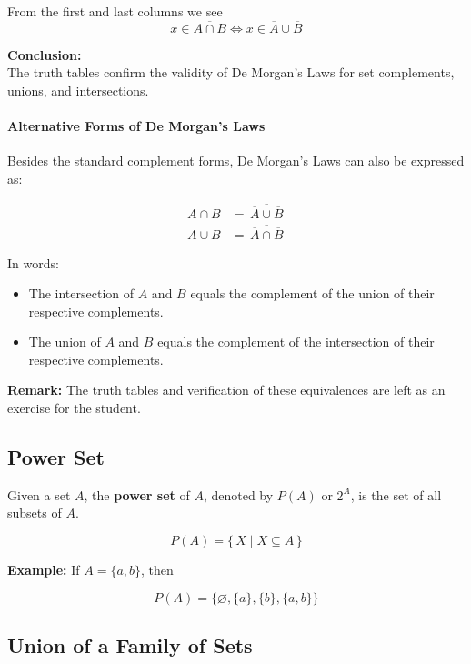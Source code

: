 \documentclass[11pt]{article}
\begin{document}
    From the first and last columns we see
    \[
    x \in \overline{A \cap B} \iff x \in \overline{A} \cup \overline{B}
    \]

    \textbf{Conclusion:}\\
    The truth tables confirm the validity of De Morgan's Laws for set complements, unions, and intersections.

    \paragraph{Alternative Forms of De Morgan's Laws}

    Besides the standard complement forms, De Morgan's Laws can also be expressed as:

    \begin{align*}
        A \cap B &= \overline{\,\overline{A} \cup \overline{B}\,} \\[1em]
        A \cup B &= \overline{\,\overline{A} \cap \overline{B}\,}
    \end{align*}

    \noindent
    In words:
    \begin{itemize}
        \item The intersection of $A$ and $B$ equals the complement of the union of their respective complements.
        \item The union of $A$ and $B$ equals the complement of the intersection of their respective complements.
    \end{itemize}

    \noindent
    \textbf{Remark:} The truth tables and verification of these equivalences are left as an exercise for the student.


    \subsection{Power Set}
    \label{subsec:power-set}

    Given a set $A$, the \textbf{power set} of $A$, denoted by $P(A)$ or $2^A$, is the set of all subsets of $A$.

    \[
    P(A) = \{\, X \mid X \subseteq A\,\}
    \]

    \textbf{Example:}
    If $A = \{a, b\}$, then

    \[
    P(A) = \{\varnothing, \{a\}, \{b\}, \{a, b\}\}
    \]

    

    \subsection*{Union of a Family of Sets}
\end{document}
